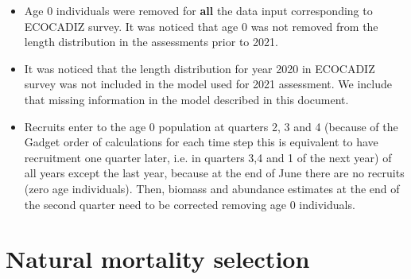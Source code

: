 \documentclass[review]{elsarticle}
\begin{document}
\begin{itemize}
\item Age 0 individuals were removed for \textbf{all} the data input corresponding to ECOCADIZ survey. It was noticed that age 0 was not removed from the length distribution in the assessments prior to 2021.
\item It was noticed that the length distribution for year 2020 in ECOCADIZ survey was not included in the model used for 2021 assessment. We include that missing information in the model described in this document.
\item Recruits enter to the age 0 population at quarters 2, 3 and 4  (because of the Gadget order of calculations for each time step this is equivalent to have recruitment one quarter later, i.e. in quarters 3,4 and 1 of the next year) of all years except the last year, because at the end of June there are no recruits (zero age individuals). Then, biomass and abundance estimates at the end of the second quarter need to be corrected removing age 0 individuals.


\end{itemize}

\section{Natural mortality selection}
\end{document}
